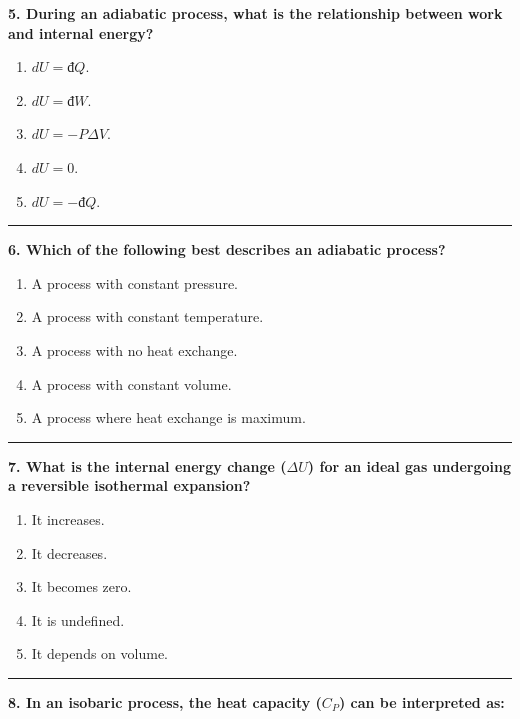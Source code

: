 \documentclass[
  9pt,
]{extbook}
\providecommand{\tightlist}{%
  \setlength{\itemsep}{0pt}\setlength{\parskip}{0pt}}
\theoremstyle{definition}
\theoremstyle{definition}
\theoremstyle{definition}
\theoremstyle{remark}
\begin{document}
\textbf{5. During an adiabatic process, what is the relationship between work and internal energy?}

\begin{enumerate}
\def\labelenumi{\alph{enumi}.}
\tightlist
\item
  \(dU = đQ\).
\item
  \(dU = đW\).
\item
  \(dU = -P \Delta V\).
\item
  \(dU = 0\).
\item
  \(dU = -đQ\).
\end{enumerate}

\begin{center}\rule{0.5\linewidth}{0.5pt}\end{center}

\textbf{6. Which of the following best describes an adiabatic process?}

\begin{enumerate}
\def\labelenumi{\alph{enumi}.}
\tightlist
\item
  A process with constant pressure.
\item
  A process with constant temperature.
\item
  A process with no heat exchange.
\item
  A process with constant volume.
\item
  A process where heat exchange is maximum.
\end{enumerate}

\begin{center}\rule{0.5\linewidth}{0.5pt}\end{center}

\textbf{7. What is the internal energy change (\(\Delta U\)) for an ideal gas undergoing a reversible isothermal expansion?}

\begin{enumerate}
\def\labelenumi{\alph{enumi}.}
\tightlist
\item
  It increases.
\item
  It decreases.
\item
  It becomes zero.
\item
  It is undefined.
\item
  It depends on volume.
\end{enumerate}

\begin{center}\rule{0.5\linewidth}{0.5pt}\end{center}

\textbf{8. In an isobaric process, the heat capacity (\(C_P\)) can be interpreted as:}
\end{document}
